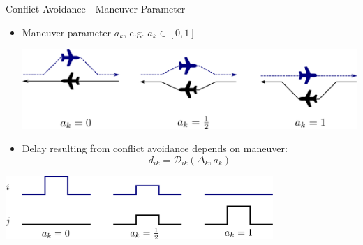 \documentclass[10pt]{beamer}
\begin{document}
\begin{frame}[t]{Conflict Avoidance - Maneuver Parameter}
    \begin{itemize}
        \item Maneuver parameter $a_k$, e.g. $a_k \in [0, 1]$
            \hfill
            \begin{minipage}[c]{0.9\linewidth}
                \includegraphics[width=1.0\textwidth]{images/conflict_avoiding_maneuver_parameter.pdf}
            \end{minipage}
        \item Delay resulting from conflict avoidance depends on maneuver:
            \begin{equation*}
                d_{ik} = \mathcal{D}_{ik}(\Delta_k, a_k) 
            \end{equation*}
    \end{itemize} 
    \begin{center}
    \includegraphics[width=0.76\textwidth]{images/conflict_delay_function_maneuver.pdf}
    \end{center}

\end{frame}
\end{document}
